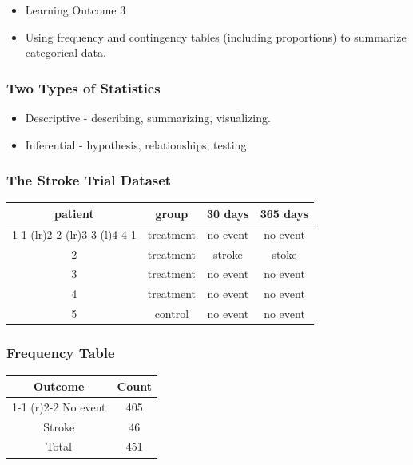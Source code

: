 \documentclass{beamer}
\begin{document}
\begin{frame}
  \begin{itemize}
    \item[] Learning Outcome 3
      \vspace{0.5cm}
    \item[] Using frequency and contingency tables (including
    proportions) to summarize categorical data. 
  \end{itemize}
\end{frame}

\begin{frame}
  \frametitle{Two Types of Statistics}
  \begin{itemize}
    \item[] Descriptive - describing, summarizing, visualizing.
      \vspace{0.5cm}
    \item[] Inferential - hypothesis, relationships, testing. 
  \end{itemize}
\end{frame}


\begin{frame}
  \frametitle{The Stroke Trial Dataset}
  \begin{table}
    \begin{tabular}{@{}cccc@{}}
      \toprule
      patient & group & 30 days & 365 days \\ 
      \cmidrule(r){1-1} \cmidrule(lr){2-2} \cmidrule(lr){3-3}
      \cmidrule(l){4-4}
      1 & treatment & no event & no event \\[0.3em]
      2 & treatment & stroke & stoke \\[0.3em]
      3 & treatment & no event & no event \\[0.3em]
      4 & treatment & no event & no event \\[0.3em]
      5 & control & no event & no event \\
      \bottomrule
    \end{tabular}
  \end{table}
\end{frame}

\begin{frame}
  \frametitle{Frequency Table}
  \begin{table}
    \begin{tabular}{@{}cc@{}}
      \toprule
      Outcome & Count \\
      \cmidrule(r){1-1} \cmidrule(r){2-2} 
      No event & 405 \\[0.3em]
      Stroke & 46 \\[0.3em]
      Total  & 451 \\
      \bottomrule
    \end{tabular}
  \end{table}
\end{frame}
\end{document}
